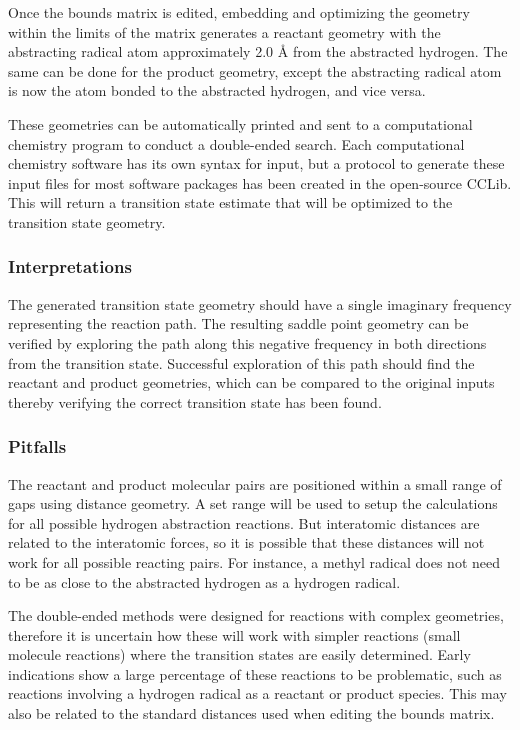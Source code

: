 \documentclass[12pt]{article}
\begin{document}
Once the bounds matrix is edited, embedding and optimizing the geometry within the limits of the matrix generates a reactant geometry with the abstracting radical atom approximately 2.0 {\AA} from the abstracted hydrogen. The same can be done for the product geometry, except the abstracting radical atom is now the atom bonded to the abstracted hydrogen, and vice versa.

These geometries can be automatically printed and sent to a computational chemistry program to conduct a double-ended search. Each computational chemistry software has its own syntax for input, but a protocol to generate these input files for most software packages has been created in the open-source CCLib. This will return a transition state estimate that will be optimized to the transition state geometry.

\subsubsection{Interpretations}

The generated transition state geometry should have a single imaginary frequency representing the reaction path. The resulting saddle point geometry can be verified by exploring the path along this negative frequency in both directions from the transition state. Successful exploration of this path should find the reactant and product geometries, which can be compared to the original inputs thereby verifying the correct transition state has been found.

\subsubsection{Pitfalls}

The reactant and product molecular pairs are positioned within a small range of gaps using distance geometry. A set range will be used to setup the calculations for all possible hydrogen abstraction reactions. But interatomic distances are related to the interatomic forces, so it is possible that these distances will not work for all possible reacting pairs. For instance, a methyl radical does not need to be as close to the abstracted hydrogen as a hydrogen radical.

The double-ended methods were designed for reactions with complex geometries, therefore it is uncertain how these will work with simpler reactions (small molecule reactions) where the transition states are easily determined. Early indications show a large percentage of these reactions to be problematic, such as reactions involving a hydrogen radical as a reactant or product species. This may also be related to the standard distances used when editing the bounds matrix.
\end{document}
